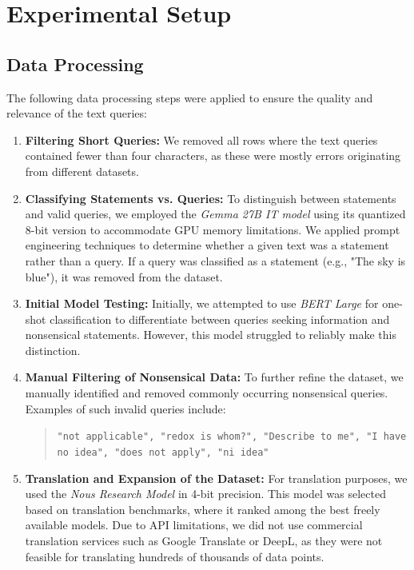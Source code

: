\section{Experimental Setup}\label{section::experimental_setup}

\subsection{Data Processing}
The following data processing steps were applied to ensure the quality and relevance of the text queries:

\begin{enumerate}
    \item \textbf{Filtering Short Queries:}
    We removed all rows where the text queries contained fewer than four characters, as these were mostly errors originating from different datasets.
    
    \item \textbf{Classifying Statements vs. Queries:}  
    To distinguish between statements and valid queries, we employed the \textit{Gemma 27B IT model} \cite{team2024gemma} using its quantized 8-bit version to accommodate GPU memory limitations. We applied prompt engineering techniques to determine whether a given text was a statement rather than a query. If a query was classified as a statement (e.g., "The sky is blue"), it was removed from the dataset.
    
    \item \textbf{Initial Model Testing:}  
    Initially, we attempted to use \textit{BERT Large} for one-shot classification to differentiate between queries seeking information and nonsensical statements. However, this model struggled to reliably make this distinction.
    
    \item \textbf{Manual Filtering of Nonsensical Data:}  
    To further refine the dataset, we manually identified and removed commonly occurring nonsensical queries. Examples of such invalid queries include:  
    \begin{quote}
    \texttt{"not applicable", "redox is whom?", "Describe to me", "I have no idea", "does not apply", "ni idea"}
    \end{quote}
    
    \item \textbf{Translation and Expansion of the Dataset:}  
    For translation purposes, we used the \textit{Nous Research Model} \cite{teknium2024hermes} in 4-bit precision. This model was selected based on translation benchmarks, where it ranked among the best freely available models. Due to API limitations, we did not use commercial translation services such as Google Translate or DeepL, as they were not feasible for translating hundreds of thousands of data points.
    

\end{enumerate}
